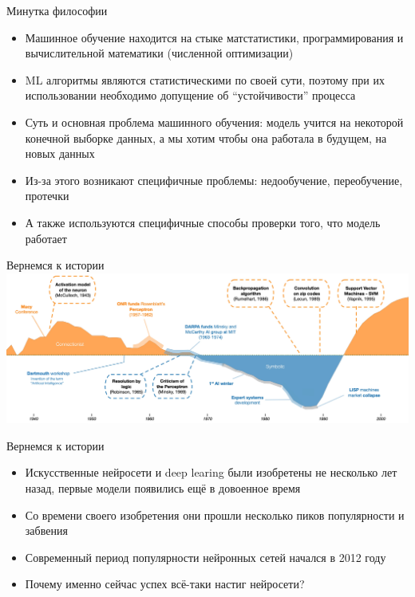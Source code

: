 \documentclass[aspectratio=169]{beamer}
\begin{document}
\begin{frame}{Минутка философии}
    \begin{itemize}
        \item Машинное обучение находится на стыке матстатистики, программирования и
        вычислительной математики (численной оптимизации)
        \pause{}
        \item ML алгоритмы являются статистическими по своей сути, поэтому при их
        использовании необходимо допущение об ``устойчивости'' процесса
        \pause{}
        \item Суть и основная проблема машинного обучения: модель учится на некоторой
        конечной выборке данных, а мы хотим чтобы она работала в будущем, на
        новых данных
        \pause{}
        \item Из-за этого возникают специфичные проблемы: недообучение,
        переобучение, протечки
        \pause{}
        \item А также используются специфичные способы проверки того, что модель работает
    \end{itemize}
\end{frame}

\begin{frame}{Вернемся к истории}
    \includegraphics[width=\linewidth]{graphs/fig2.jpg}
\end{frame}

\begin{frame}{Вернемся к истории}
    \large
    \begin{itemize}
        \item Искусственные нейросети и deep learing были изобретены не несколько лет назад,
        первые модели появились ещё в довоенное время
        \pause{}
        \item Со времени своего изобретения они прошли несколько пиков популярности
        и забвения
        \pause{}
        \item Современный период популярности нейронных сетей начался в 2012 году
        \item Почему именно сейчас успех всё-таки настиг нейросети?
    \end{itemize}
\end{frame}
\end{document}
